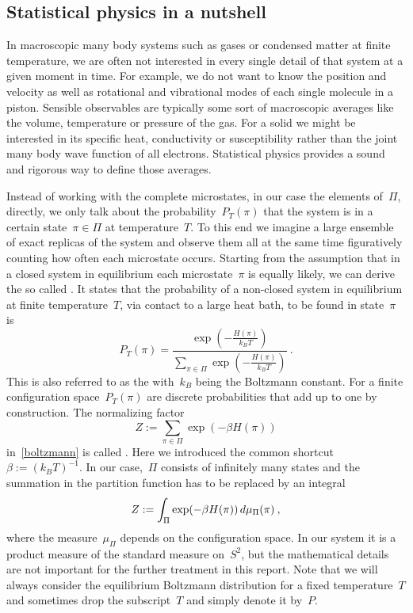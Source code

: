 \subsection{Statistical physics in a nutshell}

In macroscopic many body systems such as gases or condensed matter at finite
temperature, we are often not interested in every single detail of that system
at a given moment in time. For example, we do not want to know the position and
velocity as well as rotational and vibrational modes of each single molecule in
a piston. Sensible observables are typically some sort of macroscopic averages
like the volume, temperature or pressure of the gas. For a solid we might be
interested in its specific heat, conductivity or susceptibility rather than the
joint many body wave function of all electrons. Statistical physics provides a
sound and rigorous way to define those averages.

Instead of working with the complete microstates, in our case the elements
of~$\Pi$, directly, we only talk about the probability~$P_{T}(\pi)$ that the
system is in a certain state~$\pi \in \Pi$ at temperature~$T$. To this end we
imagine a large ensemble of exact replicas of the system and observe them all at
the same time figuratively counting how often each microstate occurs. Starting
from the assumption that in a closed system in equilibrium each microstate~$\pi$
is equally likely, we can derive the so called . It
states that the probability of a non-closed system in equilibrium at finite
temperature~$T$, \eg{} via contact to a large heat bath, to be found in
state~$\pi$ is
%
\begin{equation}\label{boltzmann}
  P_{T}(\pi) = \frac{\exp \left(- \frac{H(\pi)}{k_B T}\right)}
  {\sum_{\pi \in \Pi} \exp \left(- \frac{H(\pi)}{k_B T}\right)}\:.
\end{equation}
%
This is also referred to as the 
with~$k_B$ being the Boltzmann constant. For a finite configuration
space~$P_T(\pi)$ are discrete probabilities that add up to one by construction.
The normalizing factor
%
\begin{equation}
  Z := \sum_{\pi \in \Pi} \exp(-\beta H(\pi))
\end{equation}
%
in~\eqref{boltzmann} is called . Here we introduced
the common shortcut~$\beta := {(k_B T)}^{-1}$. In our case,~$\Pi$ consists of
infinitely many states and the summation in the partition function has to be
replaced by an integral
%
\begin{equation}
  Z := \int_{\Pi} \exp(-\beta H(\pi)) \,d\mu_{\Pi}(\pi)\:,
\end{equation}
%
where the measure~$\mu_{\Pi}$ depends on the configuration space. In our system
it is a product measure of the standard measure on~$S^2$, but the mathematical
details are not important for the further treatment in this report. Note that we
will always consider the equilibrium Boltzmann distribution for a fixed
temperature~$T$ and sometimes drop the subscript~$T$ and simply denote it
by~$P$.

